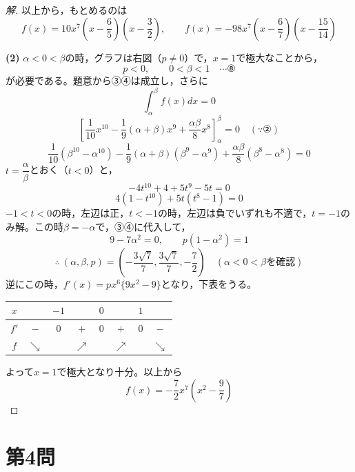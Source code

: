 \documentclass[../main.tex]{subfiles}
\begin{document}
\begin{proof}[解]
  以上から，もとめるのは
  \[
    f(x)=10x^7\left(x-\frac65\right)\left(x-\frac32\right), \qquad f(x)=-98x^7\left(x-\frac67\right)\left(x-\frac{15}{14}\right)
  \]

  \textbf{(2)} $\alpha<0<\beta$の時，グラフは右図（$p\ne0$）で，$x=1$で極大なことから，
  \[
    p<0, \qquad 0<\beta<1 \quad\cdots\text{⑧}
  \]
  が必要である。題意から③④は成立し，さらに
  \[
    \int_\alpha^\beta f(x)dx=0
  \]
  \[
    \left[\frac1{10}x^{10}-\frac19(\alpha+\beta)x^9+\frac{\alpha\beta}8x^8\right]_\alpha^\beta=0 \quad(\because②)
  \]
  \[
    \frac1{10}(\beta^{10}-\alpha^{10})-\frac19(\alpha+\beta)(\beta^9-\alpha^9)+\frac{\alpha\beta}8(\beta^8-\alpha^8)=0
  \]
  $t=\dfrac\alpha\beta$とおく（$t<0$）と，
  \[
    -4t^{10}+4+5t^9-5t=0
  \]
  \[
    4(1-t^{10})+5t(t^8-1)=0
  \]
  $-1<t<0$の時，左辺は正，$t<-1$の時，左辺は負でいずれも不適で，$t=-1$のみ解。この時$\beta=-\alpha$で，③④に代入して，
  \[
    9-7\alpha^2=0, \qquad p(1-\alpha^2)=1
  \]
  \[
    \therefore\ (\alpha,\beta,p)=\left(-\frac{3\sqrt7}7,\frac{3\sqrt7}7,-\frac72\right) \quad(\alpha<0<\beta\text{を確認})
  \]
  逆にこの時，$f'(x)=px^6\{9x^2-9\}$となり，下表をうる。
  \begin{center}
    \begin{tabular}{c|ccccccc}
      $x$ & & $-1$ & & $0$ & & $1$ & \\
      \hline
      $f'$ & $-$ & $0$ & $+$ & $0$ & $+$ & $0$ & $-$ \\
      \hline
      $f$ & $\searrow$ & & $\nearrow$ & & $\nearrow$ & & $\searrow$
    \end{tabular}
  \end{center}
  よって$x=1$で極大となり十分。以上から
  \[
    f(x)=-\frac72x^7\left(x^2-\frac97\right)
  \]
\end{proof}

\newpage

\section*{第4問}
\end{document}
